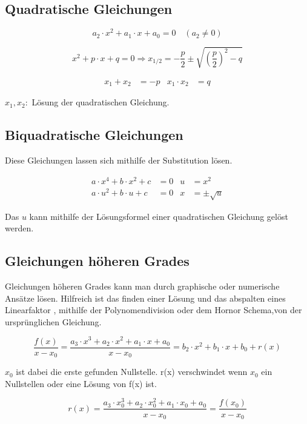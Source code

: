 \subsection{Quadratische Gleichungen}
\begin{shaded}
 \begin{equation}
  a_2\cdot x^2+a_1\cdot x+a_0=0\quad (a_2\neq0)
 \end{equation}
\end{shaded}

\begin{shaded}
 \begin{equation}
  x^2+p\cdot x+q=0\Rightarrow x_{1/2}=-\frac{p}{2}\pm\sqrt{\left(\frac{p}{2}\right)^2-q}
 \end{equation}
\end{shaded}

\begin{shaded}
 \begin{align}
  x_1+x_2&=-p& x_1\cdot x_2&=q 
 \end{align}
\end{shaded}
$x_1, x_2:$ Lösung der quadratischen Gleichung.

\subsection{Biquadratische Gleichungen}
Diese Gleichungen lassen sich mithilfe der Substitution lösen.
\begin{shaded}
 \begin{align}
  a\cdot x^4+b\cdot x^2 +c&=0&u&=x^2 \\
  a\cdot u^2+b\cdot u +c&=0&x&=\pm\sqrt{u}
 \end{align}
\end{shaded}
Das $u$ kann mithilfe der Lösungsformel einer quadratischen Gleichung gelöst werden.

\subsection{Gleichungen höheren Grades} 
Gleichungen höheren Grades kann man durch graphische oder numerische Ansätze lösen. Hilfreich ist das finden einer Lösung und das abspalten eines Linearfaktor
, mithilfe der Polynomendivision oder dem Hornor Schema,von der ursprünglichen Gleichung.

\begin{shaded}
 \begin{equation}
  \frac{f(x)}{x-x_0}=\frac{a_3\cdot x^3+a_2\cdot x^2+a_1\cdot x +a_0}{x-x_0}=b_2\cdot x^2+b_1 \cdot x+b_0+r(x)
 \end{equation}
\end{shaded}
$x_0$ ist dabei die erste gefunden Nullstelle. r(x) verschwindet wenn $x_0$ ein Nullstellen oder eine Lösung von f(x) ist.
\begin{shaded}
 \begin{equation}
  r(x)=\frac{a_3\cdot x_0^3+a_2\cdot x_0^2+a_1\cdot x_0 +a_0}{x-x_0}=\frac{f(x_0)}{x-x_0}
 \end{equation}
\end{shaded}


